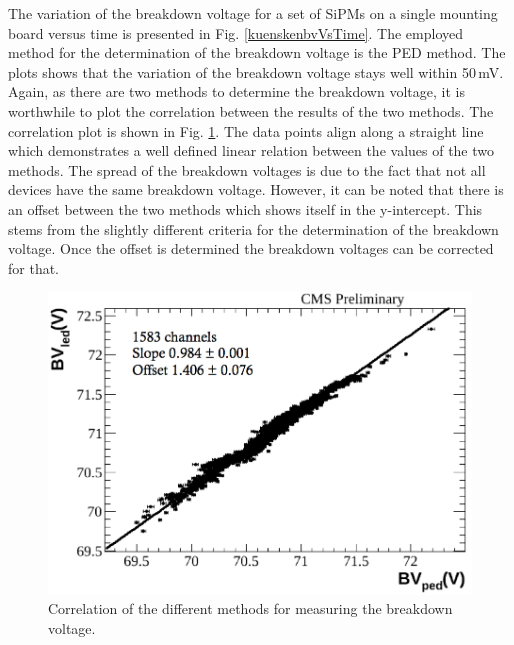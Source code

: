 The variation of the breakdown voltage for a set of SiPMs on a single mounting board versus time is presented in Fig. \ref{kuenskenbvVsTime}. The employed method for the determination of the breakdown voltage is the PED method. The plots shows that the variation of the breakdown voltage stays well within 50\,mV.
Again, as there are two methods to determine the breakdown voltage, it is worthwhile to plot the correlation between the results of the two methods. The correlation plot is shown in Fig. \ref{kuenskenbvCorr}. The data points align along a straight line which demonstrates a well defined linear relation between the values of the two methods. The spread of the breakdown voltages is due to the fact that not all devices have the same breakdown voltage. However, it can be noted that there is an offset between the two methods which shows itself in the y-intercept. This stems from the slightly different criteria for the determination of the breakdown voltage. Once the offset is determined the breakdown voltages can be corrected for that.
\begin{figure}
\centering
\begin{minipage}[b]{0.475\textwidth}
\includegraphics[width=\textwidth]{Figures/kuensken/bvCorrelation.png}
\end{minipage}
\hspace{0.5cm}
\begin{minipage}[b]{0.475\textwidth}
\caption{Correlation of the different methods for measuring the breakdown voltage.}
\label{kuenskenbvCorr}
\end{minipage}
\end{figure}
